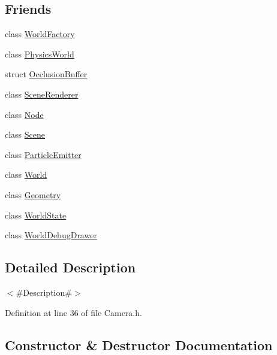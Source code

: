 \subsection*{Friends}
\begin{DoxyCompactItemize}
\item 
class \mbox{\hyperlink{classnjli_1_1_camera_acb96ebb09abe8f2a37a915a842babfac}{World\+Factory}}
\item 
class \mbox{\hyperlink{classnjli_1_1_camera_abd7959b8cbcd7c25bc6c0c8b1ea26ce6}{Physics\+World}}
\item 
struct \mbox{\hyperlink{classnjli_1_1_camera_af60c965608a88762c5d3b48490472319}{Occlusion\+Buffer}}
\item 
class \mbox{\hyperlink{classnjli_1_1_camera_aae6efa51fde36cf2c0759009ba7b19c0}{Scene\+Renderer}}
\item 
class \mbox{\hyperlink{classnjli_1_1_camera_a6db9d28bd448a131448276ee03de1e6d}{Node}}
\item 
class \mbox{\hyperlink{classnjli_1_1_camera_a032858ae1fe02d2d1170981c2af2d67c}{Scene}}
\item 
class \mbox{\hyperlink{classnjli_1_1_camera_a82b374d797a09668286ac5cf26f539f3}{Particle\+Emitter}}
\item 
class \mbox{\hyperlink{classnjli_1_1_camera_a7b4bcdf992c21ae83363f25df05b1d25}{World}}
\item 
class \mbox{\hyperlink{classnjli_1_1_camera_a9aca7b7350e6ffa0e2d6320834ad1857}{Geometry}}
\item 
class \mbox{\hyperlink{classnjli_1_1_camera_a59cdb6fe5b378389e35b8b2a2f4e990e}{World\+State}}
\item 
class \mbox{\hyperlink{classnjli_1_1_camera_a1b3bfa4a6d43aea5db6bd35f03087249}{World\+Debug\+Drawer}}
\end{DoxyCompactItemize}


\subsection{Detailed Description}
$<$\#\+Description\#$>$ 

Definition at line 36 of file Camera.\+h.



\subsection{Constructor \& Destructor Documentation}
\mbox{\label{classnjli_1_1_camera_a6b242e7ea1b008c3073fea985ac01bc7}} 
